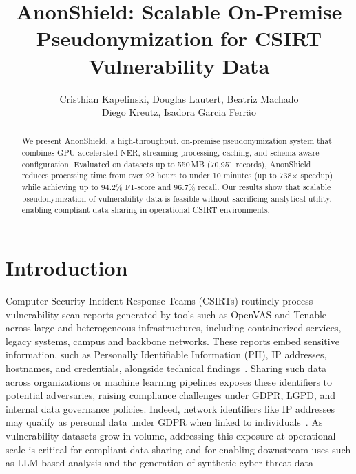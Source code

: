 \documentclass[12pt]{article}
\title{AnonShield: Scalable On-Premise\\Pseudonymization for CSIRT Vulnerability Data}
\author{Cristhian Kapelinski\inst{1}, Douglas Lautert\inst{1}, Beatriz Machado\inst{1}\\Diego Kreutz\inst{1}, Isadora Garcia Ferrão\inst{2}}
\begin{document}
 
\maketitle
     
\begin{abstract}
We present AnonShield, a high-throughput, on-premise pseudonymization system that combines GPU-accelerated NER, streaming processing, caching, and schema-aware configuration. Evaluated on datasets up to 550\,MB (70{,}951 records), AnonShield reduces processing time from over 92 hours to under 10 minutes (up to 738$\times$ speedup) while achieving up to 94.2\% F1-score and 96.7\% recall.
Our results show that scalable pseudonymization of vulnerability data is feasible without sacrificing analytical utility, enabling compliant data sharing in operational CSIRT environments.
\end{abstract}


\section{Introduction}
\label{sec:intro}

Computer Security Incident Response Teams (CSIRTs) routinely process vulnerability scan reports generated by tools such as OpenVAS and Tenable across large and heterogeneous infrastructures, including containerized services, legacy systems, campus and backbone networks. These reports embed sensitive information, such as Personally Identifiable Information (PII), IP addresses, hostnames, and credentials, alongside technical findings~\cite{Kapelinski2025}. Sharing such data across organizations or machine learning pipelines exposes these identifiers to potential adversaries, raising compliance challenges under GDPR, LGPD, and internal data governance policies. Indeed, network identifiers like IP addresses may qualify as personal data under GDPR when linked to individuals~\cite{Albakri2019,Nweke2020}. As vulnerability datasets grow in volume, addressing this exposure at operational scale is critical for compliant data sharing and for enabling downstream uses such as LLM-based analysis and the generation of synthetic cyber threat data~\cite{almorjan2025synthetic}
\end{document}
